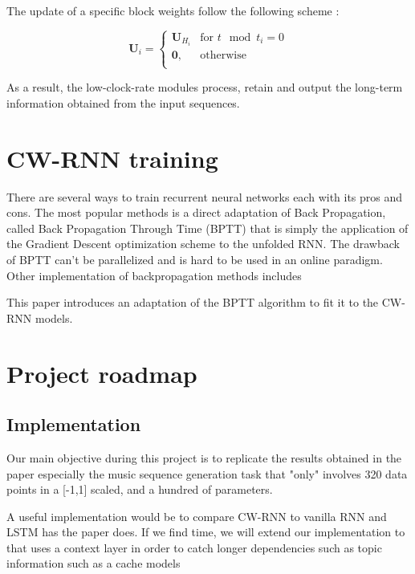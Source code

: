 \documentclass[a4paper,10pt]{article}
\begin{document}
The update of a specific block weights follow the following scheme : 

\begin{equation}
 \textbf{U}_i = 
 \begin{cases}
 	\textbf{U}_{H_i} & \text{for } t \mod t_i = 0 \\
	\textbf{0}, & \text{otherwise}  \\
\end{cases}
\end{equation}

As a result, the low-clock-rate modules process, retain and output the long-term information obtained from the input sequences.

\section{CW-RNN training}

There are several ways to train recurrent neural networks each with its pros and cons. The most popular methods is a direct adaptation of Back Propagation, called Back Propagation Through Time (BPTT) \cite{bptt-1} \cite{bptt-2} that is simply the application of the Gradient Descent optimization scheme to the unfolded RNN. The drawback of BPTT can't be parallelized and is hard to be used in an online paradigm. Other implementation of backpropagation methods includes 

This paper introduces an adaptation of the BPTT algorithm to fit it to the CW-RNN models.

\section{Project roadmap}

\subsection{Implementation}
Our main objective during this project is to replicate the results obtained in the paper especially the music sequence generation task that "only" involves 320 data points in a [-1,1] scaled, and a hundred of parameters.

A useful implementation would be to compare CW-RNN to vanilla RNN and LSTM has the paper does.
If we find time, we will extend our implementation to \cite{rnn-mikolov} that uses a context layer in order to catch longer dependencies such as topic information such as a cache models \cite{cache_models}
\end{document}
